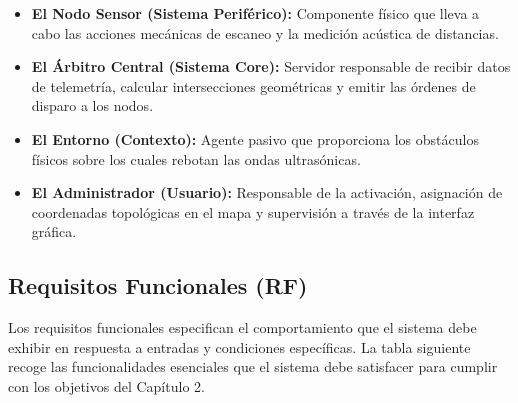 \begin{itemize}
    \item \textbf{El Nodo Sensor (Sistema Periférico):} Componente físico que lleva a cabo las acciones mecánicas de escaneo y la medición acústica de distancias.
    \item \textbf{El Árbitro Central (Sistema Core):} Servidor responsable de recibir datos de telemetría, calcular intersecciones geométricas y emitir las órdenes de disparo a los nodos.
    \item \textbf{El Entorno (Contexto):} Agente pasivo que proporciona los obstáculos físicos sobre los cuales rebotan las ondas ultrasónicas.
    \item \textbf{El Administrador (Usuario):} Responsable de la activación, asignación de coordenadas topológicas en el mapa y supervisión a través de la interfaz gráfica.
\end{itemize}

\subsection{Requisitos Funcionales (RF)}

Los requisitos funcionales especifican el comportamiento que el sistema debe exhibir en respuesta a entradas y condiciones específicas. La tabla siguiente recoge las funcionalidades esenciales que el sistema debe satisfacer para cumplir con los objetivos del Capítulo 2.

